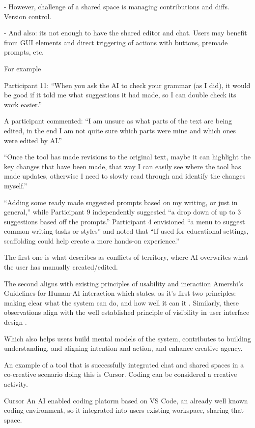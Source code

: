 - However, challenge of a shared space is managing contributions and diffs. Version control. 

- And also: its not enough to have the shared editor and chat. Users may benefit from GUI elements and direct triggering of actions with buttons, premade prompts, etc. 

For example

Participant 11: “When you ask the AI to check your grammar (as I did), it would be good if it told me what suggestions it had made, so I can double check its work easier.”

A participant commented:  “I am unsure as what parts of the text are being edited, in the end I am not quite sure which parts were mine and which ones were edited by AI.”

 “Once the tool has made revisions to the original text, maybe it can highlight the key
changes that have been made, that way I can easily see where the tool has made updates, otherwise I need to
slowly read through and identify the changes myself.”

“Adding some ready made suggested prompts based on my writing, or just in general,” while Participant 9 independently suggested “a drop down of up to 3 suggestions based off the prompts.” Participant 4 envisioned “a menu to suggest common writing tasks or styles” and
noted that “If used for educational settings, scaffolding
could help create a more hands-on experience.”

The first one is what \cite{Buschek2021-ks} describes as conflicts of territory, where AI overwrites what the user has manually created/edited.

The second aligns with existing principles of usability and ineraction Amershi's Guidelines for Human-AI interaction which states, as it's first two principles: making clear what the system can do, and how well it can it \cite{Amershi2019-wu}. Similarly, these observations align with the well established principle of visibility in user interface design \cite{Nielsen1994-df}.

Which also helps users build mental models of the system, contributes to building understanding, and aligning intention and action, and enhance creative agency.

An example of a tool that is successfully integrated chat and shared spaces in a co-creative scenario doing this is Cursor. 
Coding can be considered a creative activity. 

Cursor An AI enabled coding platorm based on VS Code, an already well known coding environment, so it integrated into users existing workspace, sharing that space.  

